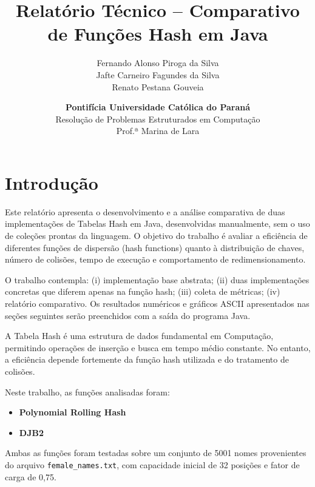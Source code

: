 \documentclass[12pt,a4paper]{abntex2}
\begin{document}
\title{Relatório Técnico -- Comparativo de Funções Hash em Java}
\author{Fernando Alonso Piroga da Silva \\ Jafte Carneiro Fagundes da Silva \\ Renato Pestana Gouveia}
\date{\textbf{Pontifícia Universidade Católica do Paraná} \\ Resolução de Problemas Estruturados em Computação \\ Prof.ª Marina de Lara}
\maketitle

\tableofcontents
\newpage

\section{Introdução}
Este relatório apresenta o desenvolvimento e a análise comparativa de duas implementações de Tabelas Hash em Java, desenvolvidas manualmente, sem o uso de coleções prontas da linguagem. O objetivo do trabalho é avaliar a eficiência de diferentes funções de dispersão (hash functions) quanto à distribuição de chaves, número de colisões, tempo de execução e comportamento de redimensionamento.

O trabalho contempla: (i) implementação base abstrata; (ii) duas implementações concretas que diferem apenas na função hash; (iii) coleta de métricas; (iv) relatório comparativo. Os resultados numéricos e gráficos ASCII apresentados nas seções seguintes serão preenchidos com a saída do programa Java.


A Tabela Hash é uma estrutura de dados fundamental em Computação, permitindo operações de inserção e busca em tempo médio constante. No entanto, a eficiência depende fortemente da função hash utilizada e do tratamento de colisões.

Neste trabalho, as funções analisadas foram:

\begin{itemize}
  \item \textbf{Polynomial Rolling Hash}
  \item \textbf{DJB2}
\end{itemize}

Ambas as funções foram testadas sobre um conjunto de 5001 nomes provenientes do arquivo \texttt{female\_names.txt}, com capacidade inicial de 32 posições e fator de carga de 0,75.

\newpage
\end{document}
